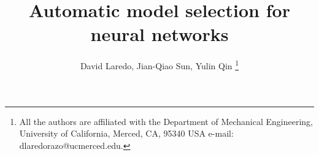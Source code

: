 \documentclass[journal]{IEEEtran}
\begin{document}
%

\title{Automatic model selection for neural networks}
%
%
%

\author{David Laredo, Jian-Qiao Sun, Yulin Qin%
\thanks{All the authors are affiliated with the Department of Mechanical Engineering, University of California, Merced,
CA, 95340 USA e-mail: dlaredorazo@ucmerced.edu.}}%

% 
%
\end{document}
